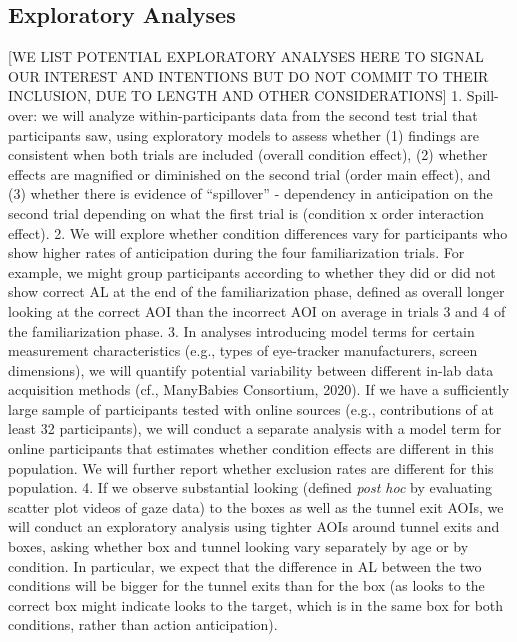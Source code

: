 \documentclass[
  english,
  man,floatsintext]{apa6}
\begin{document}
\hypertarget{exploratory-analyses}{%
\subsection{Exploratory Analyses}\label{exploratory-analyses}}

{[}WE LIST POTENTIAL EXPLORATORY ANALYSES HERE TO SIGNAL OUR INTEREST AND INTENTIONS BUT DO NOT COMMIT TO THEIR INCLUSION, DUE TO LENGTH AND OTHER CONSIDERATIONS{]}
1. Spill-over: we will analyze within-participants data from the second test trial that participants saw, using exploratory models to assess whether (1) findings are consistent when both trials are included (overall condition effect), (2) whether effects are magnified or diminished on the second trial (order main effect), and (3) whether there is evidence of ``spillover'' - dependency in anticipation on the second trial depending on what the first trial is (condition x order interaction effect).
2. We will explore whether condition differences vary for participants who show higher rates of anticipation during the four familiarization trials. For example, we might group participants according to whether they did or did not show correct AL at the end of the familiarization phase, defined as overall longer looking at the correct AOI than the incorrect AOI on average in trials 3 and 4 of the familiarization phase.
3. In analyses introducing model terms for certain measurement characteristics (e.g., types of eye-tracker manufacturers, screen dimensions), we will quantify potential variability between different in-lab data acquisition methods (cf., ManyBabies Consortium, 2020). If we have a sufficiently large sample of participants tested with online sources (e.g., contributions of at least 32 participants), we will conduct a separate analysis with a model term for online participants that estimates whether condition effects are different in this population. We will further report whether exclusion rates are different for this population.
4. If we observe substantial looking (defined \emph{post hoc} by evaluating scatter plot videos of gaze data) to the boxes as well as the tunnel exit AOIs, we will conduct an exploratory analysis using tighter AOIs around tunnel exits and boxes, asking whether box and tunnel looking vary separately by age or by condition. In particular, we expect that the difference in AL between the two conditions will be bigger for the tunnel exits than for the box (as looks to the correct box might indicate looks to the target, which is in the same box for both conditions, rather than action anticipation).
\end{document}
